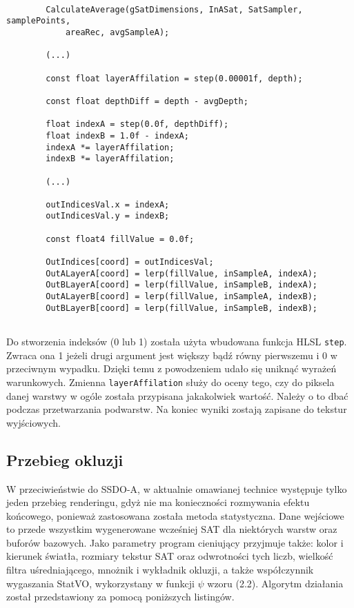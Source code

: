 		\begin{lstlisting}[language=HLSL,caption={Tworzenie warstw adaptacyjnych.},label={lst_6_K}]
		
		CalculateAverage(gSatDimensions, InASat, SatSampler, samplePoints, 
			areaRec, avgSampleA);
		
		(...)
		
		const float layerAffilation = step(0.00001f, depth);	
		
		const float depthDiff = depth - avgDepth;	
		
		float indexA = step(0.0f, depthDiff);
		float indexB = 1.0f - indexA;
		indexA *= layerAffilation;
		indexB *= layerAffilation;
		
		(...)
		
		outIndicesVal.x = indexA;
		outIndicesVal.y = indexB;
		
		const float4 fillValue = 0.0f;
		
		OutIndices[coord] = outIndicesVal;
		OutALayerA[coord] = lerp(fillValue, inSampleA, indexA);
		OutBLayerA[coord] = lerp(fillValue, inSampleB, indexA);
		OutALayerB[coord] = lerp(fillValue, inSampleA, indexB);
		OutBLayerB[coord] = lerp(fillValue, inSampleB, indexB);
		
		\end{lstlisting}
		
		Do stworzenia indeksów (0 lub 1) została użyta wbudowana funkcja HLSL \texttt{step}. Zwraca ona 1 jeżeli drugi argument jest większy bądź równy pierwszemu i 0 w przeciwnym wypadku. Dzięki temu z powodzeniem udało się uniknąć wyrażeń warunkowych. Zmienna \texttt{layerAffilation} służy do oceny tego, czy do piksela danej warstwy w ogóle została przypisana jakakolwiek wartość. Należy o to dbać podczas przetwarzania podwarstw. Na koniec wyniki zostają zapisane do tekstur wyjściowych.
	
	\subsection{Przebieg okluzji}
	\label{t:impl:b:occlusion}

		W przeciwieństwie do SSDO-A, w aktualnie omawianej technice występuje tylko jeden przebieg renderingu, gdyż nie ma konieczności rozmywania efektu końcowego, ponieważ zastosowana została metoda statystyczna. Dane wejściowe to przede wszystkim wygenerowane wcześniej SAT dla niektórych warstw oraz buforów bazowych. Jako parametry program cieniujący przyjmuje także: kolor i kierunek światła, rozmiary tekstur SAT oraz odwrotności tych liczb, wielkość filtra uśredniającego, mnożnik i wykładnik okluzji, a także współczynnik wygaszania StatVO, wykorzystany w funkcji \(\psi\) wzoru (2.2). Algorytm działania został przedstawiony za pomocą poniższych listingów.

